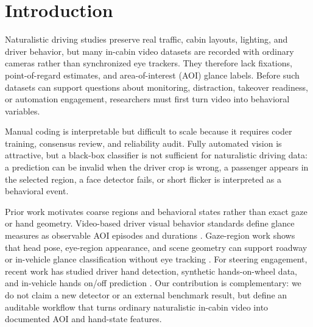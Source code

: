 \documentclass[sigconf,review,anonymous]{acmart}
\begin{document}


\maketitle

\section{Introduction}

Naturalistic driving studies preserve real traffic, cabin layouts,
lighting, and driver behavior, but many in-cabin video datasets are
recorded with ordinary cameras rather than synchronized eye trackers.
They therefore lack fixations, point-of-regard estimates, and
area-of-interest (AOI) glance labels. Before such datasets can support
questions about monitoring, distraction, takeover readiness, or
automation engagement, researchers must first turn video into behavioral
variables.

Manual coding is interpretable but difficult to scale because it requires
coder training, consensus review, and reliability audit. Fully automated
vision is attractive, but a black-box classifier is not sufficient for
naturalistic driving data: a prediction can be invalid when the driver
crop is wrong, a passenger appears in the selected region, a face detector
fails, or short flicker is interpreted as a behavioral event.

Prior work motivates coarse regions and behavioral states rather than
exact gaze or hand geometry. Video-based driver visual behavior standards
define glance measures as observable AOI episodes and durations
\cite{saeJ2396,iso15007}. Gaze-region work shows that head pose,
eye-region appearance, and scene geometry can support roadway or
in-vehicle glance classification without eye tracking
\cite{fridman2016drivergaze,fridman2016robustgaze}. For steering
engagement, recent work has studied driver hand detection, synthetic
hands-on-wheel data, and in-vehicle hands on/off prediction
\cite{borghi2018handswheel,yudkin2022handsup,pyeon2023handsonoff}.
Our contribution is complementary: we do not claim a new detector or an
external benchmark result, but define an auditable workflow that turns
ordinary naturalistic in-cabin video into documented AOI and hand-state
features.
\end{document}
